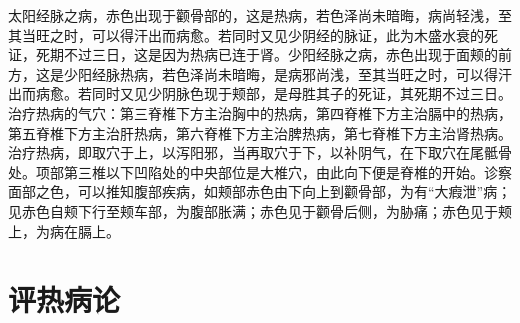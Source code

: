 \documentclass[12pt,UTF8]{ctexbook}
\begin{document}
太阳经脉之病，赤色出现于颧骨部的，这是热病，若色泽尚未暗晦，病尚轻浅，至其当旺之时，可以得汗出而病愈。若同时又见少阴经的脉证，此为木盛水衰的死证，死期不过三日，这是因为热病已连于肾。少阳经脉之病，赤色出现于面颊的前方，这是少阳经脉热病，若色泽尚未暗晦，是病邪尚浅，至其当旺之时，可以得汗出而病愈。若同时又见少阴脉色现于颊部，是母胜其子的死证，其死期不过三日。
治疗热病的气穴：第三脊椎下方主治胸中的热病，第四脊椎下方主治膈中的热病，第五脊椎下方主治肝热病，第六脊椎下方主治脾热病，第七脊椎下方主治肾热病。治疗热病，即取穴于上，以泻阳邪，当再取穴于下，以补阴气，在下取穴在尾骶骨处。项部第三椎以下凹陷处的中央部位是大椎穴，由此向下便是脊椎的开始。诊察面部之色，可以推知腹部疾病，如颊部赤色由下向上到颧骨部，为有“大瘕泄”病；见赤色自颊下行至颊车部，为腹部胀满；赤色见于颧骨后侧，为胁痛；赤色见于颊上，为病在膈上。

\chapter{评热病论}
\end{document}
